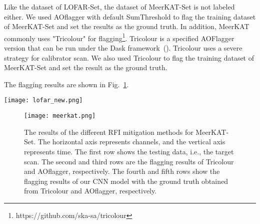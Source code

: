 \documentclass[usenatbib]{mnras}
\begin{document}
Like the dataset of LOFAR-Set, the dataset of MeerKAT-Set is not labeled either. We used AOflagger with default SumThreshold to flag the training dataset of MeerKAT-Set and set the results as the ground truth. In addition, MeerKAT commonly uses "Tricolour" for flagging\footnote{https://github.com/ska-sa/tricolour}. Tricolour is a specified AOFlagger version that can be run under the Dask framework~(\cite{Dask}). Tricolour uses a severe strategy for calibrator scan. We also used Tricolour to flag the training dataset of MeerKAT-Set and set the result as the ground truth.

The flagging results are shown in Fig.~\ref{fig:meerkat}.



\begin{figure*}
\begin{center}

	\texttt{[image: lofar\_new.png]}
\end{center}
    \caption{The results of the different RFI mitigation methods for LOFAR-Set. The horizontal axis is frequency, and the vertical axis is time. The first row is the amplitude of the testing data. The second and the third row are flagging results of our CNN method and the AOflagger, respectively. The others correspond to applying different thresholds to the data for flagging.}
    \label{fig:lofar_result}
\end{figure*}


\begin{figure}
\begin{center}
	\texttt{[image: meerkat.png]}
\end{center}
    \caption{The results of the different RFI mitigation methods for MeerKAT-Set. The horizontal axis represents channels, and the vertical axis represents time. The first row shows the testing data, i.e., the target scan. The second and third rows are the flagging results of Tricolour and AOflagger, respectively. The fourth and fifth rows show the flagging results of our CNN model with the ground truth obtained from Tricolour and AOflagger, respectively. }
    \label{fig:meerkat}
\end{figure}
\end{document}
